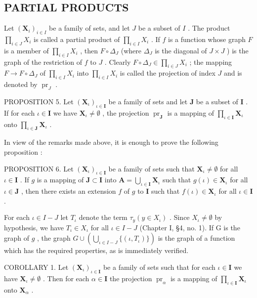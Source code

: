 \subsection{PARTIAL PRODUCTS}

Let \((\mathbf{X}_i)_{i\in I}\) be a family of sets, and let \(J\) be a subset of \(I\) . The product \(\prod_{i\in J} X_i\) is called a partial product of \(\prod_{i\in I} X_i\) . If \(f\) is a function whose graph \(F\) is a member of \(\prod_{i\in I} X_i\) , then \(F \circ \Delta_J\) (where \(\Delta_J\) is the diagonal of \(J \times J\) ) is the graph of the restriction of \(f\) to \(J\) . Clearly \(F \circ \Delta_J \in \prod_{i\in J} X_i\) ; the mapping \(F \to F \circ \Delta_J\) of \(\prod_{i\in I} X_i\) into \(\prod_{i\in I} X_i\) is called the projection of index \(J\) and is denoted by \(\operatorname{pr}_J\) .

PROPOSITION 5. Let \((\mathbf{X}_{\iota})_{\iota \in \mathbf{I}}\) be a family of sets and let \(\mathbf{J}\) be a subset of \(\mathbf{I}\) . If for each \(\iota \in \mathbf{I}\) we have \(\mathbf{X}_{\iota} \neq \emptyset\) , the projection \(\operatorname{pr}_{\mathbf{J}}\) is a mapping of \(\prod_{\iota \in \mathbf{I}} \mathbf{X}_{\iota}\) onto \(\prod_{\iota \in \mathbf{J}} \mathbf{X}_{\iota}\) .

In view of the remarks made above, it is enough to prove the following proposition :

PROPOSITION 6. Let \((\mathbf{X}_{\iota})_{\iota \in \mathbf{I}}\) be a family of sets such that \(\mathbf{X}_{\iota} \neq \emptyset\) for all \(\iota \in \mathbf{I}\) . If \(g\) is a mapping of \(\mathbf{J} \subset \mathbf{I}\) into \(\mathbf{A} = \bigcup_{\iota \in \mathbf{I}} \mathbf{X}_{\iota}\) such that \(g(\iota) \in \mathbf{X}_{\iota}\) for all \(\iota \in \mathbf{J}\) , then there exists an extension \(f\) of \(g\) to \(\mathbf{I}\) such that \(f(\iota) \in \mathbf{X}_{\iota}\) for all \(\iota \in \mathbf{I}\) .

For each \(\iota\in I-J\) let \(T_{\iota}\) denote the term \(\tau_{y}(y\in X_{\iota})\) . Since \(X_{\iota}\neq\emptyset\) by hypothesis, we have \(T_{\iota}\in X_{\iota}\) for all \(\iota\in I-J\) (Chapter I, §4, no. 1). If G is the graph of \(g\) , the graph \(G\cup\left(\bigcup_{\iota\in I-J}\{(\iota,T_{\iota})\}\right)\) is the graph of a function which has the required properties, as is immediately verified.

COROLLARY 1. Let \((\mathbf{X}_{\iota})_{\iota \in \mathbf{I}}\) be a family of sets such that for each \(\iota \in \mathbf{I}\) we have \(\mathbf{X}_{\iota} \neq \emptyset\) . Then for each \(\alpha \in \mathbf{I}\) the projection \(\operatorname{pr}_{\alpha}\) is a mapping of \(\prod_{\iota \in \mathbf{I}} \mathbf{X}_{\iota}\) onto \(\mathbf{X}_{\alpha}\) .

